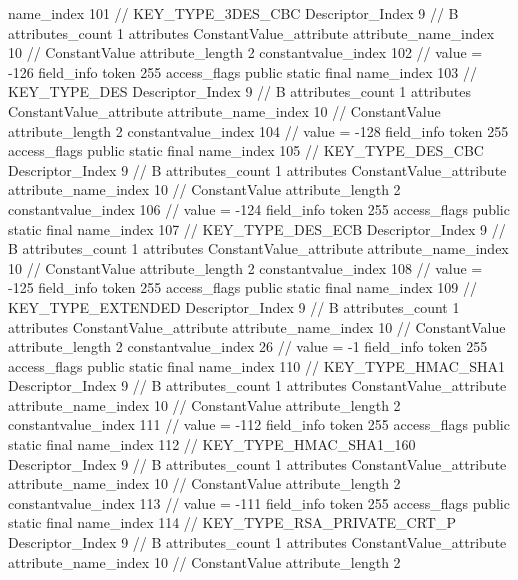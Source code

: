 {{{{{				name_index	101		// KEY_TYPE_3DES_CBC
				Descriptor_Index	9		// B
				attributes_count	1
				attributes {
				ConstantValue_attribute {
					attribute_name_index	10		// ConstantValue
					attribute_length	2
					constantvalue_index	102		// value = -126
				}
				}
			}
			field_info {
				token	255
				access_flags	public static final
				name_index	103		// KEY_TYPE_DES
				Descriptor_Index	9		// B
				attributes_count	1
				attributes {
				ConstantValue_attribute {
					attribute_name_index	10		// ConstantValue
					attribute_length	2
					constantvalue_index	104		// value = -128
				}
				}
			}
			field_info {
				token	255
				access_flags	public static final
				name_index	105		// KEY_TYPE_DES_CBC
				Descriptor_Index	9		// B
				attributes_count	1
				attributes {
				ConstantValue_attribute {
					attribute_name_index	10		// ConstantValue
					attribute_length	2
					constantvalue_index	106		// value = -124
				}
				}
			}
			field_info {
				token	255
				access_flags	public static final
				name_index	107		// KEY_TYPE_DES_ECB
				Descriptor_Index	9		// B
				attributes_count	1
				attributes {
				ConstantValue_attribute {
					attribute_name_index	10		// ConstantValue
					attribute_length	2
					constantvalue_index	108		// value = -125
				}
				}
			}
			field_info {
				token	255
				access_flags	public static final
				name_index	109		// KEY_TYPE_EXTENDED
				Descriptor_Index	9		// B
				attributes_count	1
				attributes {
				ConstantValue_attribute {
					attribute_name_index	10		// ConstantValue
					attribute_length	2
					constantvalue_index	26		// value = -1
				}
				}
			}
			field_info {
				token	255
				access_flags	public static final
				name_index	110		// KEY_TYPE_HMAC_SHA1
				Descriptor_Index	9		// B
				attributes_count	1
				attributes {
				ConstantValue_attribute {
					attribute_name_index	10		// ConstantValue
					attribute_length	2
					constantvalue_index	111		// value = -112
				}
				}
			}
			field_info {
				token	255
				access_flags	public static final
				name_index	112		// KEY_TYPE_HMAC_SHA1_160
				Descriptor_Index	9		// B
				attributes_count	1
				attributes {
				ConstantValue_attribute {
					attribute_name_index	10		// ConstantValue
					attribute_length	2
					constantvalue_index	113		// value = -111
				}
				}
			}
			field_info {
				token	255
				access_flags	public static final
				name_index	114		// KEY_TYPE_RSA_PRIVATE_CRT_P
				Descriptor_Index	9		// B
				attributes_count	1
				attributes {
				ConstantValue_attribute {
					attribute_name_index	10		// ConstantValue
					attribute_length	2
}}}}}}}

